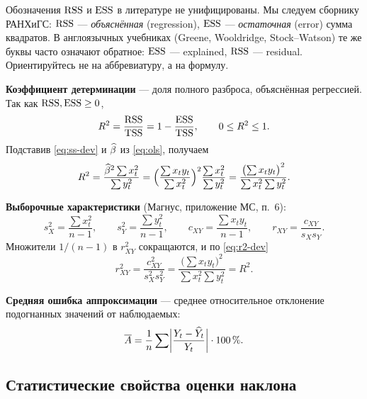 \begin{remark}
Обозначения $\mathrm{RSS}$ и $\mathrm{ESS}$ в литературе не унифицированы. Мы следуем сборнику
РАНХиГС: $\mathrm{RSS}$ — \emph{объяснённая} (regression), $\mathrm{ESS}$ — \emph{остаточная}
(error) сумма квадратов. В англоязычных учебниках (Greene, Wooldridge,
Stock--Watson) те же буквы часто означают обратное: $\mathrm{ESS}$ — explained,
$\mathrm{RSS}$ — residual. Ориентируйтесь не на аббревиатуру, а на формулу.
\end{remark}

\textbf{Коэффициент детерминации} — доля полного разброса, объяснённая
регрессией. Так как $\mathrm{RSS}, \mathrm{ESS} \ge 0$,
\begin{equation}
  R^2 = \frac{\mathrm{RSS}}{\mathrm{TSS}} = 1 - \frac{\mathrm{ESS}}{\mathrm{TSS}}, \qquad 0 \le R^2 \le 1 .
  \label{eq:r2}
\end{equation}
Подставив \eqref{eq:ss-dev} и $\widehat{\beta}$ из \eqref{eq:ols}, получаем
\begin{equation}
  R^2 = \frac{\widehat{\beta}^2\sum x_t^2}{\sum y_t^2}
      = \Bigl(\frac{\sum x_ty_t}{\sum x_t^2}\Bigr)^{2}\frac{\sum x_t^2}{\sum y_t^2}
      = \frac{\bigl(\sum x_ty_t\bigr)^2}{\sum x_t^2\sum y_t^2}.
  \label{eq:r2-dev}
\end{equation}

\textbf{Выборочные характеристики} (Магнус, приложение МС, п.~6):
\begin{equation}
  s_X^2 = \frac{\sum x_t^2}{n-1},
  \qquad
  s_Y^2 = \frac{\sum y_t^2}{n-1},
  \qquad
  c_{XY} = \frac{\sum x_ty_t}{n-1},
  \qquad
  r_{XY} = \frac{c_{XY}}{s_Xs_Y}.
  \label{eq:sample}
\end{equation}
Множители $1/(n-1)$ в $r_{XY}^2$ сокращаются, и по \eqref{eq:r2-dev}
\[
  r_{XY}^2 = \frac{c_{XY}^2}{s_X^2s_Y^2}
           = \frac{\bigl(\sum x_ty_t\bigr)^2}{\sum x_t^2\sum y_t^2}
           = R^2 .
\]

\textbf{Средняя ошибка аппроксимации} — среднее относительное отклонение
подогнанных значений от наблюдаемых:
\begin{equation}
  \overline{A} = \frac{1}{n}\sum\biggl|\frac{Y_t - \widehat{Y}_t}{Y_t}\biggr| \cdot 100\,\% .
  \label{eq:approx}
\end{equation}

\subsection{Статистические свойства оценки наклона}\label{sec:props}

